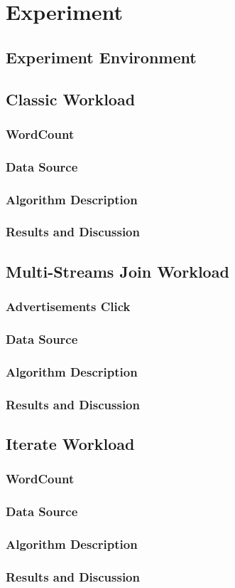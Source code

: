 \section{Experiment}
\label{chapter:experiment}

\subsection{Experiment Environment}
\label{sec:triton}

\subsection{Classic Workload}
\subsubsection{WordCount}
\subsubsection{Data Source}
\subsubsection{Algorithm Description}
\subsubsection{Results and Discussion}

\subsection{Multi-Streams Join Workload}
\subsubsection{Advertisements Click}
\subsubsection{Data Source}
\subsubsection{Algorithm Description}
\subsubsection{Results and Discussion}

\subsection{Iterate Workload}
\subsubsection{WordCount}
\subsubsection{Data Source}
\subsubsection{Algorithm Description}
\subsubsection{Results and Discussion}

\clearpage